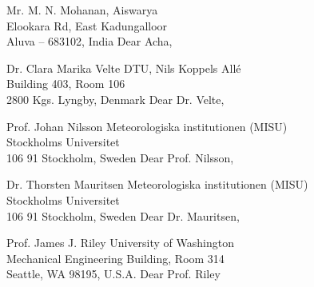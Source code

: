 Mr. M. N. Mohanan,
Aiswarya\\Elookara Rd, East Kadungalloor\\Aluva -- 683102, India
Dear Acha,

%

Dr. Clara Marika Velte
DTU, Nils Koppels Allé\\Building 403, Room 106\\2800 Kgs. Lyngby, Denmark
Dear Dr. Velte,

Prof. Johan Nilsson
Meteorologiska institutionen (MISU)\\Stockholms Universitet\\106 91 Stockholm, Sweden
Dear Prof. Nilsson,

Dr. Thorsten Mauritsen
Meteorologiska institutionen (MISU)\\Stockholms Universitet\\106 91 Stockholm, Sweden
Dear Dr. Mauritsen,

Prof. James J. Riley
University of Washington\\Mechanical Engineering Building, Room 314\\Seattle, WA 98195, U.S.A.
Dear Prof. Riley



